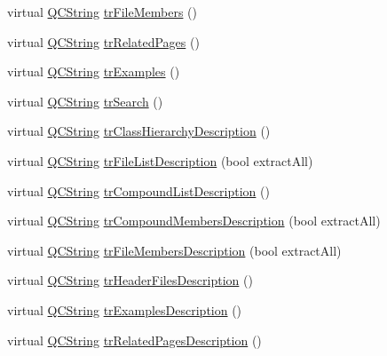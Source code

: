 \begin{DoxyCompactItemize}
\item 
virtual \mbox{\hyperlink{class_q_c_string}{Q\+C\+String}} \mbox{\hyperlink{class_translator_arabic_a92d2b70c24f76e57bbc85c1a319e2f9b}{tr\+File\+Members}} ()
\item 
virtual \mbox{\hyperlink{class_q_c_string}{Q\+C\+String}} \mbox{\hyperlink{class_translator_arabic_a08ff492a2101669714711c5f1ba3b732}{tr\+Related\+Pages}} ()
\item 
virtual \mbox{\hyperlink{class_q_c_string}{Q\+C\+String}} \mbox{\hyperlink{class_translator_arabic_a25e1edc62b0483c21294f890cea8d0cb}{tr\+Examples}} ()
\item 
virtual \mbox{\hyperlink{class_q_c_string}{Q\+C\+String}} \mbox{\hyperlink{class_translator_arabic_ac7945d5df6b91d1daa50aeb3b6993231}{tr\+Search}} ()
\item 
virtual \mbox{\hyperlink{class_q_c_string}{Q\+C\+String}} \mbox{\hyperlink{class_translator_arabic_a173d4670408b8048ce49941841f87bc7}{tr\+Class\+Hierarchy\+Description}} ()
\item 
virtual \mbox{\hyperlink{class_q_c_string}{Q\+C\+String}} \mbox{\hyperlink{class_translator_arabic_a04dd144ae8e429fd38839c3a9686c565}{tr\+File\+List\+Description}} (bool extract\+All)
\item 
virtual \mbox{\hyperlink{class_q_c_string}{Q\+C\+String}} \mbox{\hyperlink{class_translator_arabic_ada3a7c9f4dbbe8ba03053d7686e1355c}{tr\+Compound\+List\+Description}} ()
\item 
virtual \mbox{\hyperlink{class_q_c_string}{Q\+C\+String}} \mbox{\hyperlink{class_translator_arabic_a2ed218e5796759be5e85b7214f8f9d15}{tr\+Compound\+Members\+Description}} (bool extract\+All)
\item 
virtual \mbox{\hyperlink{class_q_c_string}{Q\+C\+String}} \mbox{\hyperlink{class_translator_arabic_aae7474617581eb79f4fa74169210fc5e}{tr\+File\+Members\+Description}} (bool extract\+All)
\item 
virtual \mbox{\hyperlink{class_q_c_string}{Q\+C\+String}} \mbox{\hyperlink{class_translator_arabic_a9310846b2565427aaa4fe8a719b97382}{tr\+Header\+Files\+Description}} ()
\item 
virtual \mbox{\hyperlink{class_q_c_string}{Q\+C\+String}} \mbox{\hyperlink{class_translator_arabic_a9447a02d8ff3f92c9836c317d16e9c8c}{tr\+Examples\+Description}} ()
\item 
virtual \mbox{\hyperlink{class_q_c_string}{Q\+C\+String}} \mbox{\hyperlink{class_translator_arabic_a7f2f7f73b53eee9f0aa6564deb009fc9}{tr\+Related\+Pages\+Description}} ()
\item 

\end{DoxyCompactItemize}
